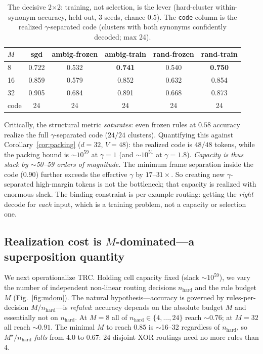 \documentclass[sigconf,nonacm]{acmart}
\theoremstyle{definition}
\begin{document}
\begin{table}[t]
\caption{The decisive 2$\times$2: training, not selection, is the lever
(hard-cluster within-synonym accuracy, held-out, 3 seeds, chance $0.5$). The
\texttt{code} column is the realized $\gamma$-separated code (clusters with both
synonyms confidently decoded; max 24).}
\label{tab:scored}
\small
\begin{tabular}{lccccc}
\toprule
$M$ & sgd & ambig-frozen & ambig-train & rand-frozen & rand-train \\
\midrule
8  & 0.722 & 0.532 & \textbf{0.741} & 0.540 & \textbf{0.750} \\
16 & 0.859 & 0.579 & 0.852 & 0.632 & 0.854 \\
32 & 0.905 & 0.684 & 0.891 & 0.668 & 0.873 \\
\midrule
code & 24 & 24 & 24 & 24 & 24 \\
\bottomrule
\end{tabular}
\end{table}

Critically, the structural metric \emph{saturates}: even frozen rules at $0.58$
accuracy realize the full $\gamma$-separated code ($24/24$ clusters). Quantifying
this against Corollary~\ref{cor:packing} ($d{=}32$, $V{=}48$): the realized code is
$48/48$ tokens, while the packing bound is $\sim10^{59}$ at $\gamma{=}1$ (and
$\sim10^{51}$ at $\gamma{=}1.8$). \emph{Capacity is thus slack by $\sim$50--59 orders
of magnitude.} The minimum frame separation inside the code ($0.90$) further exceeds
the effective $\gamma$ by $17$--$31\times$. So creating new $\gamma$-separated
high-margin tokens is not the bottleneck; that capacity is realized with enormous
slack. The binding constraint is per-example routing: getting the \emph{right} decode
for \emph{each} input, which is a training problem, not a capacity or selection one.

\subsection{Realization cost is $M$-dominated---a superposition quantity}
\label{sec:routing}
We next operationalize TRC. Holding cell capacity fixed (slack $\sim10^{59}$), we
vary the number of independent non-linear routing decisions $n_\text{hard}$ and the
rule budget $M$ (Fig.~\ref{fig:mdom}). The natural hypothesis---accuracy is governed
by rules-per-decision $M/n_\text{hard}$---is \emph{refuted}: accuracy depends on the
absolute budget $M$ and essentially not on $n_\text{hard}$. At $M{=}8$ all of
$n_\text{hard}\in\{4,\dots,24\}$ reach $\sim0.76$; at $M{=}32$ all reach $\sim0.91$.
The minimal $M$ to reach $0.85$ is $\sim$16--32 regardless of $n_\text{hard}$, so
$M^\star/n_\text{hard}$ \emph{falls} from $4.0$ to $0.67$: 24 disjoint XOR routings
need no more rules than 4.
\end{document}
